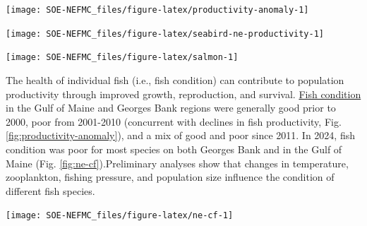 \documentclass[
  10pt,
]{article}
\let\origfigure\figure
\let\endorigfigure\endfigure
\renewenvironment{figure}[1][2] {
    \expandafter\origfigure\expandafter[H]
} {
    \endorigfigure
}
\begin{document}
\begin{figure}

{\centering \texttt{[image: SOE-NEFMC\_files/figure-latex/productivity-anomaly-1]} 

}

\caption{Fish productivity measures. Top: Small-fish-per-large-fish survey biomass anomaly in the Gulf of Maine. Bottom: assessment recruitment per spawning stock biomass anomaly for stocks managed by the New England Fishery Management Council region. The summed anomaly across species is shown by the black line, drawn across all years with the same number of stocks analyzed.}\label{fig:productivity-anomaly}
\end{figure}
\begin{figure}

{\centering \texttt{[image: SOE-NEFMC\_files/figure-latex/seabird-ne-productivity-1]} 

}

\caption{Productivity of Common terns in the Gulf of Maine.}\label{fig:seabird-ne-productivity}
\end{figure}
\begin{figure}

{\centering \texttt{[image: SOE-NEFMC\_files/figure-latex/salmon-1]} 

}

\caption{Return rate proportions and abundance of Atlantic salmon.}\label{fig:salmon}
\end{figure}

The health of individual fish (i.e., fish condition) can contribute to population productivity through improved growth, reproduction, and survival. \href{https://noaa-edab.github.io/catalog/condition.html}{Fish condition} in the Gulf of Maine and Georges Bank regions were generally good prior to 2000, poor from 2001-2010 (concurrent with declines in fish productivity, Fig. \ref{fig:productivity-anomaly}), and a mix of good and poor since 2011. In 2024, fish condition was poor for most species on both Georges Bank and in the Gulf of Maine (Fig. \ref{fig:ne-cf}).Preliminary analyses show that changes in temperature, zooplankton, fishing pressure, and population size influence the condition of different fish species.

\begin{figure}

{\centering \texttt{[image: SOE-NEFMC\_files/figure-latex/ne-cf-1]} 

}

\caption{Condition factor for fish species in New England based on fall NEFSC bottom trawl survey data. No survey was conducted in 2020.}\label{fig:ne-cf}
\end{figure}
\end{document}
